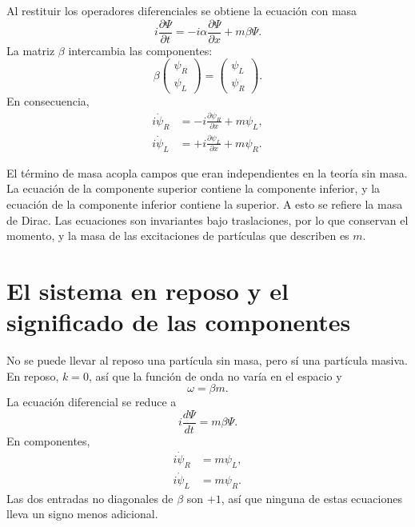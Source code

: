 Al restituir los operadores diferenciales se obtiene la ecuación con masa
\begin{equation}
i\frac{\partial\Psi}{\partial t}
=
-i\alpha\frac{\partial\Psi}{\partial x}
+m\beta\Psi.
\end{equation}
La matriz \(\beta\) intercambia las componentes:
\begin{equation}
\beta
\begin{pmatrix}
\psi_R\\
\psi_L
\end{pmatrix}
=
\begin{pmatrix}
\psi_L\\
\psi_R
\end{pmatrix}.
\end{equation}
En consecuencia,
\begin{align}
i\dot{\psi}_R
&=-i\frac{\partial\psi_R}{\partial x}+m\psi_L,\\
i\dot{\psi}_L
&=+i\frac{\partial\psi_L}{\partial x}+m\psi_R.
\end{align}

El término de masa acopla campos que eran independientes en la teoría sin masa. La ecuación de la componente superior contiene la componente inferior, y la ecuación de la componente inferior contiene la superior. A esto se refiere la masa de Dirac. Las ecuaciones son invariantes bajo traslaciones, por lo que conservan el momento, y la masa de las excitaciones de partículas que describen es \(m\).

\begin{classroomqa}
\end{classroomqa}

\section{El sistema en reposo y el significado de las componentes}

No se puede llevar al reposo una partícula sin masa, pero sí una partícula masiva. En reposo, \(k=0\), así que la función de onda no varía en el espacio y
\begin{equation}
\omega=\beta m.
\end{equation}
La ecuación diferencial se reduce a
\begin{equation}
i\frac{d\Psi}{dt}=m\beta\Psi.
\end{equation}
En componentes,
\begin{align}
i\dot{\psi}_R&=m\psi_L,\\
i\dot{\psi}_L&=m\psi_R.
\end{align}
Las dos entradas no diagonales de \(\beta\) son \(+1\), así que ninguna de estas ecuaciones lleva un signo menos adicional.

